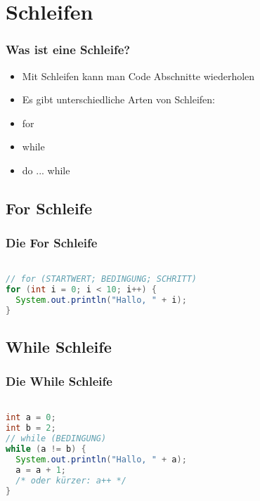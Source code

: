\documentclass{beamer}
\begin{document}
\section{Schleifen} 

\begin{frame}
	\frametitle{Was ist eine Schleife?}
	\begin{itemize}
		\item Mit Schleifen kann man Code Abschnitte wiederholen
		\item Es gibt unterschiedliche Arten von Schleifen:
		\item for
		\item while
		\item do ... while
	\end{itemize}
\end{frame}

\begin{frame}[fragile]
	\subsection{For Schleife}
	\frametitle{Die For Schleife} 
	\begin{lstlisting}[language=java]

// for (STARTWERT; BEDINGUNG; SCHRITT)
for (int i = 0; i < 10; i++) {
  System.out.println("Hallo, " + i);
}

	\end{lstlisting}
\end{frame}

\begin{frame}[fragile]
\subsection{While Schleife}
\frametitle{Die While Schleife} 
\begin{lstlisting}[language=java]

int a = 0;
int b = 2;
// while (BEDINGUNG)
while (a != b) {
  System.out.println("Hallo, " + a);
  a = a + 1;
  /* oder kürzer: a++ */	
}

	\end{lstlisting}
\end{frame}
\end{document}
